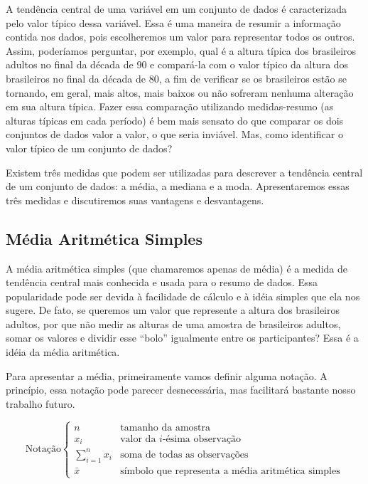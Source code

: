 \documentclass[
]{book}
\begin{document}
A tendência central de uma variável em um conjunto de dados é caracterizada pelo valor típico dessa variável. Essa é uma maneira de resumir a informação contida nos dados, pois escolheremos um valor para representar todos os outros. Assim, poderíamos perguntar, por exemplo, qual é a altura típica dos brasileiros adultos no final da década de 90 e compará-la com o valor típico da altura dos brasileiros no final da década de 80, a fim de verificar se os brasileiros estão se tornando, em geral, mais altos, mais baixos ou não sofreram nenhuma alteração em sua altura típica. Fazer essa comparação utilizando medidas-resumo (as alturas típicas em cada período) é bem mais sensato do que comparar os dois conjuntos de dados valor a valor, o que seria inviável. Mas, como identificar o valor típico de um conjunto de dados?

Existem três medidas que podem ser utilizadas para descrever a tendência central de um conjunto de dados: a média, a mediana e a moda. Apresentaremos essas três medidas e discutiremos suas vantagens e desvantagens.

\hypertarget{muxe9dia-aritmuxe9tica-simples}{%
\subsection{Média Aritmética Simples}\label{muxe9dia-aritmuxe9tica-simples}}

A média aritmética simples (que chamaremos apenas de média) é a medida de tendência central mais conhecida e usada para o resumo de dados. Essa popularidade pode ser devida à facilidade de cálculo e à idéia simples que ela nos sugere. De fato, se queremos um valor que represente a altura dos brasileiros adultos, por que não medir as alturas de uma amostra de brasileiros adultos, somar os valores e dividir esse ``bolo'' igualmente entre os participantes? Essa é a idéia da média aritmética.

Para apresentar a média, primeiramente vamos definir alguma notação. A princípio, essa notação pode parecer desnecessária, mas facilitará bastante nosso trabalho futuro.

\begin{equation*}
\text{Notação} 
    \begin{cases}
      n          & \text{tamanho da amostra} \\
      x_i        & \text{valor da $i$-ésima observação} \\
      \sum_{i=1}^n x_i & \text{soma de todas as observações} \\
      \bar x     & \text{símbolo que representa a média aritmética simples}
    \end{cases}
\end{equation*}
\end{document}
